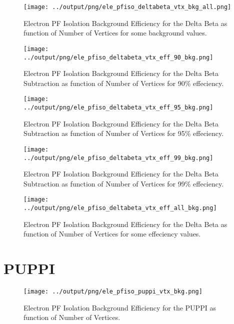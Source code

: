\documentclass[11pt]{book}
\begin{document}
\begin{figure}[htb]
\centering
\texttt{[image: ../output/png/ele\_pfiso\_deltabeta\_vtx\_bkg\_all.png]}
\caption{Electron PF Isolation Background Efficiency for the Delta Beta as function of Number of Vertices for some background values.}
\label{fig:ele_pfiso_vtx_bkg_deltabeta_bkg_all}
\end{figure}

\begin{figure}[htb]
\centering
\texttt{[image: ../output/png/ele\_pfiso\_deltabeta\_vtx\_eff\_90\_bkg.png]}
\caption{Electron PF Isolation Background Efficiency for the Delta Beta Subtraction as function of Number of Vertices for 90\% effeciency.}
\label{fig:ele_pfiso_vtx_eff_deltabeta_eff_90_bkg}
\end{figure}

\begin{figure}[htb]
\centering
\texttt{[image: ../output/png/ele\_pfiso\_deltabeta\_vtx\_eff\_95\_bkg.png]}
\caption{Electron PF Isolation Background Efficiency for the Delta Beta Subtraction as function of Number of Vertices for 95\% effeciency.}
\label{fig:ele_pfiso_vtx_eff_deltabeta_eff_95_bkg}
\end{figure}

\begin{figure}[htb]
\centering
\texttt{[image: ../output/png/ele\_pfiso\_deltabeta\_vtx\_eff\_99\_bkg.png]}
\caption{Electron PF Isolation Background Efficiency for the Delta Beta Subtraction as function of Number of Vertices for 99\% effeciency.}
\label{fig:ele_pfiso_vtx_eff_deltabeta_eff_99_bkg}
\end{figure}

\begin{figure}[htb]
\centering
\texttt{[image: ../output/png/ele\_pfiso\_deltabeta\_vtx\_eff\_all\_bkg.png]}
\caption{Electron PF Isolation Background Efficiency for the Delta Beta as function of Number of Vertices for some effeciency values.}
\label{fig:ele_pfiso_vtx_eff_deltabeta_eff_all_bkg}
\end{figure}
\clearpage

\section{PUPPI}
\begin{figure}[htb]
\centering
\texttt{[image: ../output/png/ele\_pfiso\_puppi\_vtx\_bkg.png]}
\caption{Electron PF Isolation Background Efficiency for the PUPPI as function of Number of Vertices.}
\label{fig:ele_pfiso_vtx_bgk_puppi}
\end{figure}
\end{document}
